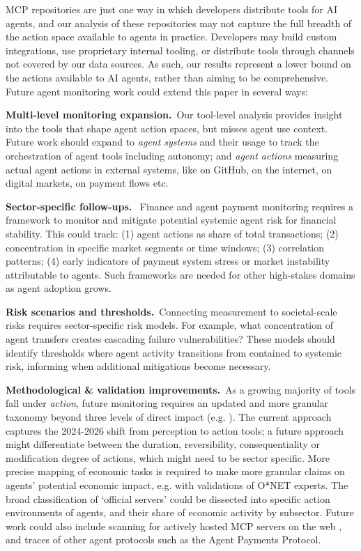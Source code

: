 \documentclass[manuscript,screen,nonacm,oneside]{acmart}
\begin{document}
MCP repositories are just one way in which developers distribute tools for AI agents, and our analysis of these repositories may not capture the full breadth of the action space available to agents in practice. Developers may build custom integrations, use proprietary internal tooling, or distribute tools through channels not covered by our data sources. As such, our results represent a lower bound on the actions available to AI agents, rather than aiming to be comprehensive. Future agent monitoring work could extend this paper in several ways:

\textbf{Multi-level monitoring expansion.}~Our tool-level analysis provides insight into the tools that shape agent action spaces, but misses agent use context. Future work should expand to \emph{agent systems} and their usage to track the orchestration of agent tools including autonomy; and \emph{agent actions} measuring actual agent actions in external systems, like on GitHub, on the internet, on digital markets, on payment flows etc.

\textbf{Sector-specific follow-ups.}~ Finance and agent payment monitoring requires a framework to monitor and mitigate potential systemic agent risk for financial stability. This could track: (1) agent actions as share of total transactions; (2) concentration in specific market segments or time windows; (3) correlation patterns; (4) early indicators of payment system stress or market instability attributable to agents. Such frameworks are needed for other high-stakes domains as agent adoption grows.

\textbf{Risk scenarios and thresholds.}~Connecting measurement to societal-scale risks requires sector-specific risk models. For example, what concentration of agent transfers creates cascading failure vulnerabilities? These models should identify thresholds where agent activity transitions from contained to systemic risk, informing when additional mitigations become necessary.

\textbf{Methodological \& validation improvements.}~As a growing majority of tools fall under \emph{action}, future monitoring requires an updated and more granular taxonomy beyond three levels of direct impact (e.g. \citealt{kasirzadeh2025characterizing}). The current approach captures the 2024-2026 shift from perception to action tools; a future approach might differentiate between the duration, reversibility, consequentiality or modification degree of actions, which might need to be sector specific. More precise mapping of economic tasks is required to make more granular claims on agents' potential economic impact, e.g. with validations of O*NET experts. The broad classification of `official servers' could be dissected into specific action environments of agents, and their share of economic activity by subsector. Future work could also include scanning for actively hosted MCP servers on the web \citep{knosticFindServer}, and traces of other agent protocols such as the Agent Payments Protocol.
\end{document}
